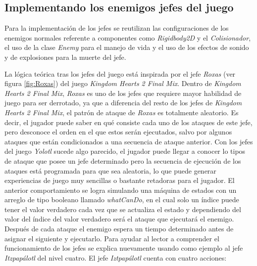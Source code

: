 \subsection{Implementando los enemigos jefes del juego}
Para la implementación de los jefes se reutilizan las configuraciones de los enemigos
normales referente a componentes como \textit{Rigidbody2D} y el \textit{Colisionador},
el uso de la clase \textit{Enemy} para el manejo de vida y el uso de los efectos
de sonido y de explosiones para la muerte del jefe.
\\
\par
La lógica teórica tras los jefes del juego está inspirada por el jefe
\textit{Roxas} (ver figura \ref{fig:Roxas}) del juego \textit{Kingdom Hearts 2
Final Mix}. Dentro de \textit{Kingdom Hearts 2 Final Mix}, \textit{Roxas} es uno
de los jefes que requiere mayor habilidad de juego para ser derrotado, ya que a
diferencia del resto de los jefes de \textit{Kingdom Hearts 2 Final Mix}, el
patrón de ataque de \textit{Roxas} es totalmente aleatorio. Es decir, el jugador
puede saber en qué consiste cada uno de los ataques de este jefe, pero desconoce
el orden en el que estos serán ejecutados, salvo por algunos ataques que están
condicionados a una secuencia de ataque anterior.  Con los jefes del juego
\textit{Yolotl} sucede algo parecido, el jugador puede llegar a conocer lo tipos
de ataque que posee un jefe determinado pero la secuencia de ejecución de los
ataques está programada para que sea aleatoria, lo que puede generar experiencias
de juego muy sencillas o bastante retadoras para el jugador. El anterior
comportamiento se logra simulando una máquina de estados con un arreglo de tipo
booleano llamado \textit{whatCanDo}, en el cual solo un índice puede tener el
valor verdadero cada vez que se actualiza el estado y dependiendo del valor del
índice del valor verdadero será el ataque que ejecutará el enemigo. Después de
cada ataque el enemigo espera un tiempo determinado antes de asignar el siguiente
y ejecutarlo. Para ayudar al lector a comprender el funcionamiento de los jefes se
explica nuevamente usando como ejemplo al jefe \textit{Itzpapálotl} del nivel
cuatro. El jefe \textit{Iztpapálotl} cuenta con cuatro acciones:
